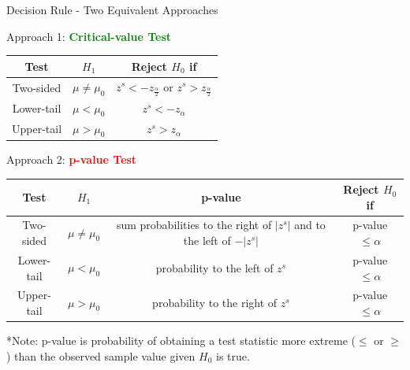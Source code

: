 \documentclass[
  10pt,
  ignorenonframetext,
]{beamer}
\begin{document}
\begin{frame}{Decision Rule - Two Equivalent Approaches}
\protect\hypertarget{decision-rule---two-equivalent-approaches-1}{}
\begin{center}
Approach 1: \textcolor{green}{\textbf{Critical-value Test}}\\
\vspace{3mm}
\begin{tabular}{|c|c|c|}
\hline
Test & $H_1$ & Reject $H_0$ if\\
\hline
Two-sided &  $\mu \neq \mu_{0}$ & $z^s < -z_{\frac{\alpha}{2}}$ or $ z^s> z_{\frac{\alpha}{2}}$\\
\hline 
Lower-tail & $\mu < \mu_{0}$ & $z^s < - z_{\alpha}$\\ 
\hline 
Upper-tail & $\mu > \mu_{0}$ & $z^s > z_{\alpha}$\\ 
\hline
\end{tabular}
\end{center}

\vspace{3mm}

\begin{center}
Approach 2: \textcolor{red}{\textbf{p-value Test}}\\
\vspace{3mm}
\begin{tabular}{|c|c|c|c|}
\hline
Test & $H_1$ & p-value & Reject $H_0$ if\\
\hline
Two-sided &  $\mu \neq \mu_{0}$ & \makecell{sum probabilities to the right \\ of $|z^s|$ and to the left of $-|z^s|$} & p-value $\leq \alpha$\\
    \hline 
Lower-tail & $\mu < \mu_{0}$ & probability to the left of $z^s$ & p-value $\leq \alpha$\\ 
\hline 
Upper-tail & $\mu > \mu_{0}$ & probability to the right of $z^s$ & p-value $\leq \alpha$\\ 
\hline
\end{tabular}
    
\vspace{1mm}
 
 \footnotesize   
*Note: p-value is probability of obtaining a test statistic more extreme ($\leq$ or $\geq$) than the observed sample value given $H_0$ is true.
\end{center}
\end{frame}
\end{document}

